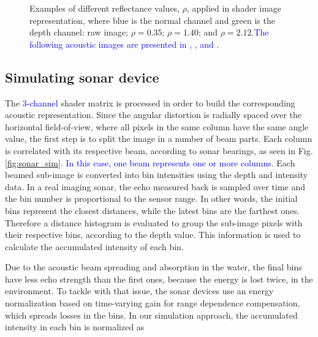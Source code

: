 \documentclass[final,5p,times]{elsarticle}
\begin{document}
\begin{figure}[!ht]
{        \label{fig:reflectance:view:2_12}
    }
    \captionsetup{justification=justified}
    \caption{Examples of different reflectance values, $\rho$, applied in
    shader image representation, where blue is the normal channel and
    green is the depth channel:  raw image;
     $\rho = 0.35$;
     $\rho = 1.40$; and
     $\rho = 2.12$.\textcolor{blue}{The following
    acoustic images are presented in ,
    , 
    and .}}
    \label{fig:sonar_reflectances}
\end{figure}



\subsection{Simulating sonar device}
\label{dev:sonardata}

The \textcolor{blue}{3-channel} shader matrix is processed in order to build the corresponding
acoustic representation. Since the angular distortion is radially spaced
over the horizontal field-of-view, where all pixels in the same column
have the same angle value, the first step is to split the image in a
number of beam parts. Each column is correlated with its respective beam,
according to sonar bearings, as seen in Fig. \ref{fig:sonar_sim}.
\textcolor{blue}{In this case, one beam represents one or more columns.} Each
beamed sub-image is converted into bin intensities using the depth and
intensity data. In a real imaging sonar, the echo measured back is sampled
over time and the bin number is proportional to the sensor range. In other
words, the initial bins represent the closest distances, while the latest
bins are the farthest ones. Therefore a distance histogram is evaluated to
group the sub-image pixels with their respective bins, according to the
depth value. This information is used to calculate the accumulated
intensity of each bin.

Due to the acoustic beam spreading and absorption in the water, the final
bins have less echo strength than the first ones, because the energy is
lost twice, in the environment. To tackle with that issue, the sonar devices
use an energy normalization based on time-varying gain for range dependence
compensation, which spreads losses in the bins. In our simulation approach,
the accumulated intensity in each bin is normalized as
\end{document}
